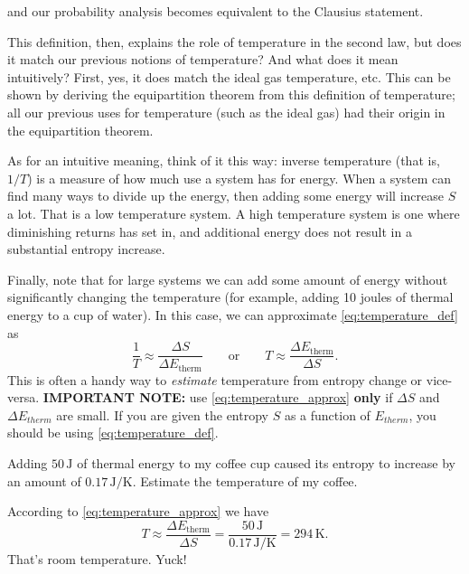 and our probability analysis becomes equivalent to the Clausius
statement.

This definition, then, explains the role of temperature in the second
law, but does it match our previous notions of temperature?  And what
does it mean intuitively?  First, yes, it does match the ideal gas
temperature, etc.  This can be shown by deriving the equipartition
theorem from this definition of temperature; all our previous uses for
temperature (such as the ideal gas) had their origin in the
equipartition theorem.

As for an intuitive meaning, think of it this way: inverse temperature
(that is, $1/T$) is a measure of how much use a system has for
energy.  When a system can find many ways to divide up the energy,
then adding some energy will increase $S$ a lot.  That is a low
temperature system.  A high temperature system is one where
diminishing returns has set in, and additional energy does not result
in a substantial entropy increase.

Finally, note that for large systems we can add some amount of energy
without significantly changing the temperature (for example, adding 10
joules of thermal energy to a cup of water).  In this case, we can
approximate \eqref{eq:temperature_def} as
\begin{equation}
\frac{1}{T} \approx \frac{\Delta S}{\Delta E_\text{therm}} 
\qquad\text{or}\qquad
T \approx  \frac{\Delta E_\text{therm}}{\Delta S}.
\label{eq:temperature_approx}
\end{equation}
This is often a handy way to \emph{estimate} temperature from entropy change
or vice-versa. \textbf{IMPORTANT NOTE:} use \eqref{eq:temperature_approx}
\textbf{only} if $\Delta S$ and $\Delta E_{therm}$ are small. If you are given
the entropy $S$ as a function of $E_{therm}$, you should be
using \eqref{eq:temperature_def}.

\begin{example}
Adding $50\,\text{J}$ of thermal energy to my coffee cup caused its
entropy to increase by an amount of $0.17\,\text{J/K}$.  Estimate the
temperature of my coffee.


\solution
According to \eqref{eq:temperature_approx} we have
\begin{equation}
T \approx  \frac{\Delta E_\text{therm}}{\Delta S} = 
\frac{50\,\text{J}}{0.17\,\text{J/K}} = 294\,\text{K}.
\end{equation}
That's room temperature.  Yuck!
\end{example}



